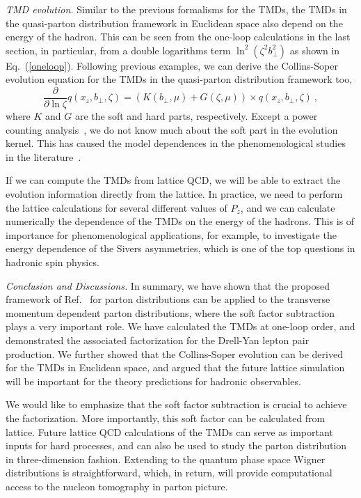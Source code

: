 \documentclass[aps,prd,preprint,tightenlines,superscriptaddress,nofootinbib]{revtex4}
\begin{document}
{\it TMD evolution.} Similar to the previous formalisms for the TMDs, the TMDs in the quasi-parton
distribution framework in Euclidean space also depend on the energy of the hadron. 
This can be seen from the one-loop calculations in the last section, in particular, 
from a double logarithms term $\ln^2(\zeta^2b_\perp^2)$
as shown in Eq.~(\ref{oneloop}). 
Following previous examples, we can derive the Collins-Soper evolution
equation for the TMDs in the quasi-parton distribution framework too,
\begin{equation}
\frac{\partial}{\partial \ln\zeta} q(x_z,b_\perp,\zeta)=\left(K(b_\perp,\mu)+G(\zeta,\mu)\right)
\times q(x_z,b_\perp,\zeta) \ , \label{cs}
\end{equation}
where $K$ and $G$ are the soft and hard parts, respectively. 
Except a power counting analysis~\cite{Korchemsky:1994is},
we do not know much about the soft part in the evolution kernel.
This has caused the model dependences in the phenomenological
studies in the literature~\cite{Sun:2013dya,Aidala:2014hva,Aybat:2011zv,Landry:2002ix,Echevarria:2014xaa}.

If we can compute the TMDs from lattice QCD, we will be
able to extract the evolution information directly from the lattice. 
In practice, we need to perform the lattice calculations for several different
values of $P_z$, and we can calculate numerically the dependence of the TMDs
on the energy of the hadrons. 
This is of importance for phenomenological
applications, for example, to investigate the energy dependence of the 
Sivers asymmetries, which is one of the top questions in hadronic spin physics.

{\it Conclusion and Discussions.}
In summary, we have shown that the proposed framework of Ref.~\cite{Ji:2013dva}
for parton distributions can be applied to the transverse momentum dependent 
parton distributions, where the soft factor subtraction plays a very important
role. We have calculated the TMDs at one-loop order, and
demonstrated the associated factorization for the Drell-Yan lepton 
pair production. We further showed that the
Collins-Soper evolution can be derived for the TMDs in Euclidean space,
and argued that the future lattice simulation will be important for the theory predictions
for hadronic observables.

We would like to emphasize that the soft factor subtraction is crucial to
achieve the factorization. More importantly, this soft factor can be calculated
from lattice. Future lattice QCD calculations of the TMDs can serve as important
inputs for hard processes, and can also be used to study the parton distribution
in three-dimension fashion. Extending to the quantum phase space Wigner distributions
is straightforward, which, in return, will provide computational access to the nucleon
tomography in parton picture. 
\end{document}
